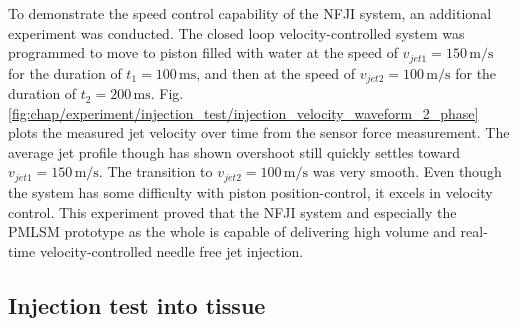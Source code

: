         
            To demonstrate the speed control capability of the \acs{NFJI} system, an additional experiment was conducted. The closed loop velocity-controlled system was programmed to move to piston filled with water at the speed of $v_{jet1}=150\,\mathrm{m/s}$ for the duration of $t_1=100\,\mathrm{ms}$, and then at the speed of $v_{jet2}=100\,\mathrm{m/s}$ for the duration of $t_2=200\,\mathrm{ms}$. Fig.\,\ref{fig:chap/experiment/injection_test/injection_velocity_waveform_2_phase} plots the measured jet velocity over time from the sensor force measurement. The average jet profile though has shown overshoot still quickly settles toward $v_{jet1}=150\,\mathrm{m/s}$. The transition to $v_{jet2}=100\,\mathrm{m/s}$ was very smooth. Even though the system has some difficulty with piston position-control, it excels in velocity control. This experiment proved that the \acs{NFJI} system and especially the \acs{PMLSM} prototype as the whole is capable of delivering high volume and real-time velocity-controlled needle free jet injection.
        
        
        \subsection{Injection test into tissue}              \label{Chapter:experiment/validation/injection test in tissue}
        
